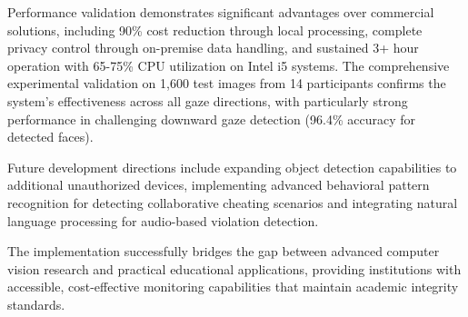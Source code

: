 \documentclass[conference]{IEEEtran}
\begin{document}
Performance validation demonstrates significant advantages over commercial solutions, 
including 90\% cost reduction through local processing, complete privacy control 
through on-premise data handling, and sustained 3+ hour operation with 65-75\% CPU 
utilization on Intel i5 systems. The comprehensive experimental validation on 1,600 
test images from 14 participants confirms the system's effectiveness across all gaze 
directions, with particularly strong performance in challenging downward gaze detection 
(96.4\% accuracy for detected faces).

Future development directions include expanding object detection capabilities to 
additional unauthorized devices, implementing advanced behavioral pattern recognition 
for detecting collaborative cheating scenarios and integrating natural language 
processing for audio-based violation detection.

The implementation successfully bridges the gap between advanced computer vision research 
and practical educational applications, providing institutions with accessible, 
cost-effective monitoring capabilities that maintain academic integrity standards.
\end{document}
